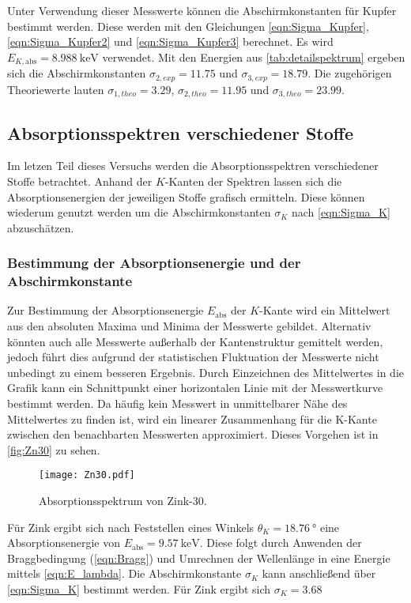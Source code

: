 Unter Verwendung dieser Messwerte können die Abschirmkonstanten für Kupfer bestimmt werden. Diese werden mit den Gleichungen 
\eqref{eqn:Sigma_Kupfer}, \eqref{eqn:Sigma_Kupfer2} und \eqref{eqn:Sigma_Kupfer3} berechnet. Es wird $E_{K,\text{abs}} = \qty{8.988}{\kilo\electronvolt}$ \cite{NIST}
verwendet. Mit den Energien aus \autoref{tab:detailspektrum} ergeben sich die Abschirmkonstanten $\sigma_{2,exp} = 11.75$ und 
$\sigma_{3,exp} = 18.79$. Die zugehörigen Theoriewerte lauten $\sigma_{1,theo} = 3.29$, $\sigma_{2,theo} = 11.95$ und 
$\sigma_{3,theo} = 23.99$.

\subsection{Absorptionsspektren verschiedener Stoffe}
\label{subsec:Absorption}
Im letzen Teil dieses Versuchs werden die Absorptionsspektren verschiedener Stoffe betrachtet. Anhand der $K$-Kanten der Spektren lassen sich die Absorptionsenergien 
der jeweiligen Stoffe grafisch ermitteln. Diese können wiederum genutzt werden um die Abschirmkonstanten $\sigma_K$ nach \autoref{eqn:Sigma_K} abzuschätzen.

\subsubsection{Bestimmung der Absorptionsenergie und der Abschirmkonstante}
Zur Bestimmung der Absorptionsenergie $E_\text{abs}$ der $K$-Kante wird ein Mittelwert aus den absoluten Maxima und Minima der Messwerte gebildet.
Alternativ könnten auch alle Messwerte außerhalb der Kantenstruktur gemittelt werden, jedoch führt dies aufgrund der statistischen Fluktuation der Messwerte nicht
unbedingt zu einem besseren Ergebnis. Durch Einzeichnen des Mittelwertes in die Grafik kann ein Schnittpunkt einer horizontalen Linie mit der Messwertkurve bestimmt werden.
Da häufig kein Messwert in unmittelbarer Nähe des Mittelwertes zu finden ist, wird ein linearer Zusammenhang für die K-Kante zwischen den benachbarten Messwerten
approximiert. Dieses Vorgehen ist in \autoref{fig:Zn30} zu sehen.

\begin{figure}
  \centering
  \texttt{[image: Zn30.pdf]}
  \caption{Absorptionsspektrum von Zink-30.}
  \label{fig:Zn30}
\end{figure}

Für Zink ergibt sich nach Feststellen eines Winkels $\theta_K = \qty{18.76}{\degree}$ eine Absorptionsenergie von $E_\text{abs} = \qty{9.57}{\kilo\electronvolt}$.
Diese folgt durch Anwenden der Braggbedingung (\autoref{eqn:Bragg}) und Umrechnen der Wellenlänge in eine Energie mittels \autoref{eqn:E_lambda}.
Die Abschirmkonstante $\sigma_K$ kann anschließend über \autoref{eqn:Sigma_K} bestimmt werden. 
Für Zink ergibt sich $\sigma_K = 3.68$

